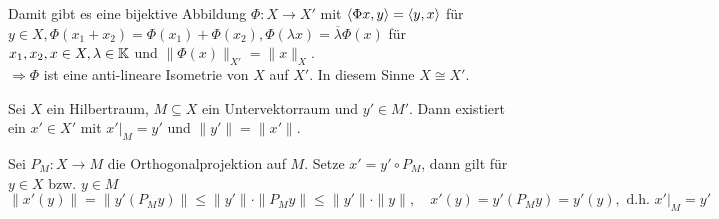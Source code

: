 \begin{bemerkung*}
	Damit gibt es eine bijektive Abbildung $\Phi : X \rightarrow X'$ mit $\langle \Phi x , y \rangle = \langle y , x \rangle$ für $y \in X, 
	 \Phi(x_{1} + x_{2}) = \Phi(x_{1}) + \Phi(x_{2}), \Phi(\lambda x) = \overline{\lambda} \Phi(x)$ für $x_{1}, x_{2}, x \in X, \lambda \in \mathbb{K}$ und $\| \Phi(x) \|_{X'} = \| x \|_{X}$.\\
	 $\Rightarrow \Phi$ ist eine anti-lineare Isometrie von $X$ auf $X'$. In diesem Sinne $X \cong X'$.
\end{bemerkung*}


\begin{kor}
	Sei $X$ ein Hilbertraum, $M \subseteq X$ ein Untervektorraum und $y' \in M'$. Dann existiert ein $x' \in X'$ mit $x'|_{M} = y'$ und $\| y' \| = \| x' \|$.	
\end{kor}

\begin{beweis}
	Sei $P_{M} \colon X \rightarrow M$ die Orthogonalprojektion auf $M$. Setze $x' = y' \circ P_{M}$, dann gilt für $y \in X$ bzw. $y \in M$
	\[ \| x'(y) \| = \| y'(P_{M} y ) \| \leq \| y' \| \cdot \| P_{M} y \| \leq \| y' \| \cdot \| y \|, \quad x'(y) = y'(P_{M} y) = y'(y), \text{ d.h. } x'|_{M} = y' \]	
\end{beweis}



\newpage